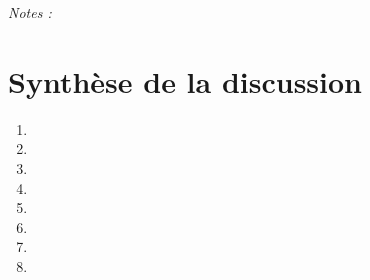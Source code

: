 \documentclass[11pt,a4paper]{article}
\begin{document}
\vspace{1cm}
\textit{Notes :} \makebox[\textwidth]{\hrulefill}

\clearpage

\section*{Synthèse de la discussion}

\begin{enumerate}[nosep]
    \item[] \makebox[\textwidth]{\hrulefill}
    \item[] \makebox[\textwidth]{\hrulefill}
    \item[] \makebox[\textwidth]{\hrulefill}
    \item[] \makebox[\textwidth]{\hrulefill}
    \item[] \makebox[\textwidth]{\hrulefill}
    \item[] \makebox[\textwidth]{\hrulefill}
    \item[] \makebox[\textwidth]{\hrulefill}
    \item[] \makebox[\textwidth]{\hrulefill}
\end{enumerate}
\end{document}
